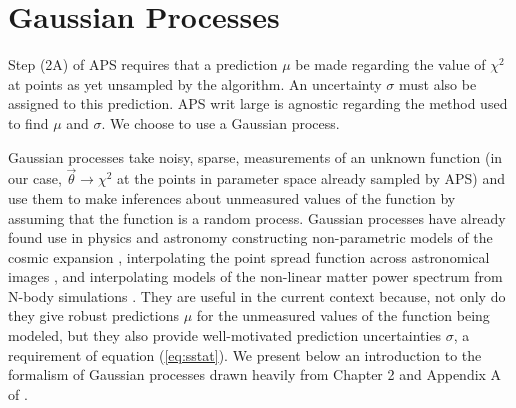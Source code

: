 \documentclass[useAMS,usenatbib]{aastex}
\newcommand{\APS}{APS }
\begin{document}
\section{Gaussian Processes}
\label{sec:gp}

Step (2A) of \APS requires that a prediction $\mu$ be made regarding the value
of $\chi^2$ at points as yet unsampled by the algorithm.  An uncertainty $\sigma$
must also be assigned to this prediction.  APS writ large is agnostic regarding
the method used to find $\mu$ and $\sigma$.  We choose to use a Gaussian process.

Gaussian processes take noisy, sparse, measurements of an unknown function (in our
case, $\vec{\theta}\rightarrow\chi^2$ at
the points in parameter space already sampled by APS) and use them to
make inferences about unmeasured values of the function by assuming that the
function is a random process.  Gaussian processes have already found use in physics
and astronomy constructing non-parametric models of the cosmic expansion
\cite{ericgp}, interpolating the point spread function across 
astronomical images
\cite{psf}, and interpolating models of the non-linear matter
power spectrum from N-body simulations \cite{habib}.
They are useful in the current context because, not only do they
give robust predictions $\mu$ for the unmeasured values of the
function being modeled, but they also
provide well-motivated prediction uncertainties $\sigma$, a requirement of
equation (\ref{eq:sstat}).  We present below an introduction to the
formalism of Gaussian processes drawn heavily
from Chapter 2 and Appendix A 
of \cite{gp}.
\end{document}
